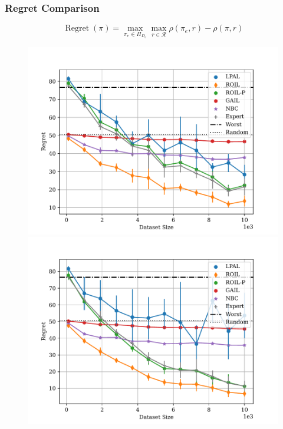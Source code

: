 \documentclass{beamer}
\DeclareMathOperator{\regret}{Regret}
\begin{document}
\begin{frame}
\frametitle{Regret Comparison}

\[ \regret(\pi) = \max_{\pi_e \in \Pi_{D_e}} \max_{r \in \mathcal{R}} \rho(\pi_e, r) - \rho(\pi, r)\]

\begin{figure}
  \begin{center}
  \begin{minipage}{0.46\linewidth}
    \centering
    \includegraphics[width=\linewidth]{plots/regrets/40x40_gridworld_on_policy_regret_regrets.pdf}
  \end{minipage}
  \hspace{0.05\linewidth}
  \begin{minipage}{0.46\linewidth}
    \centering
    \includegraphics[width=\linewidth]{plots/regrets/40x40_gridworld_off_policy_regret_regrets.pdf}
  \end{minipage}
  \end{center}
\end{figure}
\end{frame}
\end{document}

